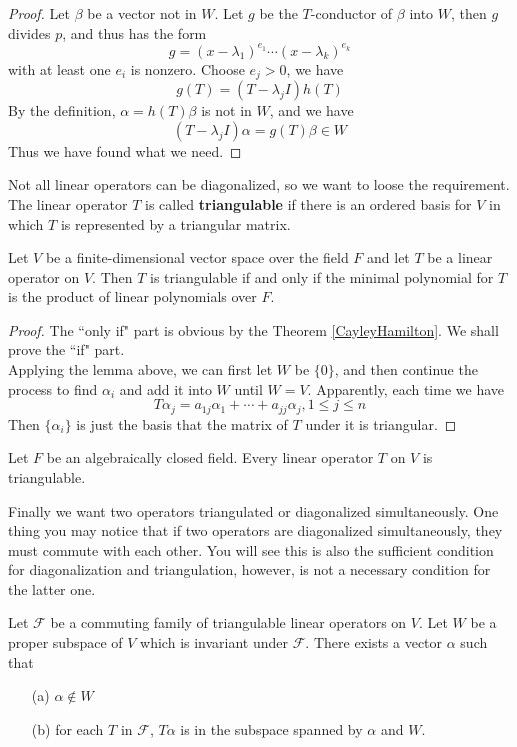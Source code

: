 \documentclass{article}
\begin{document}
\begin{proof}
	Let $\beta$ be a vector not in $W$. Let $g$ be the $T$-conductor of $\beta$ into $W$, then $g$ divides $p$, and thus has the form
	\[g=(x-\lambda_1)^{e_1}\cdots(x-\lambda_k)^{e_k}\]
	with at least one $e_i$ is nonzero. Choose $e_j>0$, we have
	\[g(T)=(T-\lambda_j I)h(T)\]
	By the definition, $\alpha=h(T)\beta$ is not in $W$, and we have
	\[(T-\lambda_j I)\alpha=g(T)\beta\in W\]
	Thus we have found what we need.
\end{proof}
Not all linear operators can be diagonalized, so we want to loose the requirement. The linear operator $T$ is called \textbf{triangulable} if there is an ordered basis for $V$ in which $T$ is represented by a triangular matrix.
\begin{thm}\label{SchurDecomposition}
	Let $V$ be a finite-dimensional vector space over the field $F$ and let $T$ be a linear operator on $V$. Then $T$ is triangulable if and only if the minimal polynomial for $T$ is the product of linear polynomials over $F$.
\end{thm}
\begin{proof}
	The ``only if" part is obvious by the Theorem \ref{CayleyHamilton}. We shall prove the ``if" part.\\
	Applying the lemma above, we can first let $W$ be $\{0\}$, and then continue the process to find $\alpha_i$ and add it into $W$ until $W=V$. Apparently, each time we have
	\[T\alpha_j=a_{1j}\alpha_1+\cdots+a_{jj}\alpha_j,1\le j\le n\]
	Then $\{\alpha_i\}$ is just the basis that the matrix of $T$ under it is triangular. 
\end{proof} 
\begin{coro}
	Let $F$ be an algebraically closed field. Every linear operator $T$ on $V$ is triangulable.
\end{coro}
Finally we want two operators triangulated or diagonalized simultaneously. One thing you may notice that if two operators are diagonalized simultaneously, they must commute with each other. You will see this is also the sufficient condition for diagonalization and triangulation, however, is not a necessary condition for the latter one.
\begin{lem}
	Let $\mathcal{F}$ be a commuting family of triangulable linear operators on $V$. Let $W$ be a proper subspace of $V$ which is invariant under $\mathcal{F}$. There exists a vector $\alpha$ such that
	\begin{enumerate}
		\item [(a)]$\alpha\notin W$
		\item [(b)]for each $T$ in $\mathcal{F}$, $T\alpha$ is in the subspace spanned by $\alpha$ and $W$.
	\end{enumerate}
\end{lem}
\end{document}
